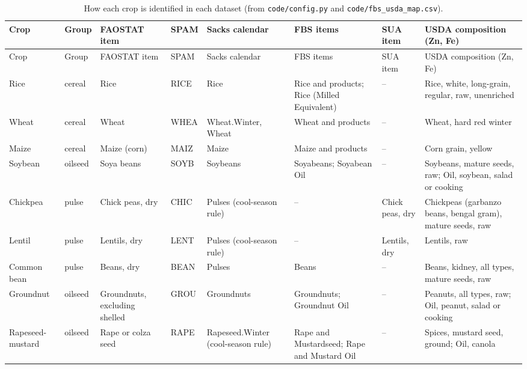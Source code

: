 {\scriptsize\begin{longtable}{L{0.105}L{0.072}L{0.124}L{0.059}L{0.137}L{0.170}L{0.098}L{0.235}}
\caption[How each crop is identified in each dataset]{How each crop is identified in each dataset (from \texttt{code/config.py} and \texttt{code/fbs\_usda\_map.csv}).}\label{tab:cropmap}\\
\toprule
Crop & Group & FAOSTAT item & SPAM & Sacks calendar & FBS items & SUA item & USDA composition (Zn, Fe) \\
\midrule\endfirsthead
\toprule
Crop & Group & FAOSTAT item & SPAM & Sacks calendar & FBS items & SUA item & USDA composition (Zn, Fe) \\
\midrule\endhead
\bottomrule\endfoot
Rice & cereal & Rice & RICE & Rice & Rice and products; Rice (Milled Equivalent) & -- & Rice, white, long-grain, regular, raw, unenriched \\
Wheat & cereal & Wheat & WHEA & Wheat.Winter, Wheat & Wheat and products & -- & Wheat, hard red winter \\
Maize & cereal & Maize (corn) & MAIZ & Maize & Maize and products & -- & Corn grain, yellow \\
Soybean & oilseed & Soya beans & SOYB & Soybeans & Soyabeans; Soyabean Oil & -- & Soybeans, mature seeds, raw; Oil, soybean, salad or cooking \\
Chickpea & pulse & Chick peas, dry & CHIC & Pulses (cool-season rule) & -- & Chick peas, dry & Chickpeas (garbanzo beans, bengal gram), mature seeds, raw \\
Lentil & pulse & Lentils, dry & LENT & Pulses (cool-season rule) & -- & Lentils, dry & Lentils, raw \\
Common bean & pulse & Beans, dry & BEAN & Pulses & Beans & -- & Beans, kidney, all types, mature seeds, raw \\
Groundnut & oilseed & Groundnuts, excluding shelled & GROU & Groundnuts & Groundnuts; Groundnut Oil & -- & Peanuts, all types, raw; Oil, peanut, salad or cooking \\
Rapeseed-mustard & oilseed & Rape or colza seed & RAPE & Rapeseed.Winter (cool-season rule) & Rape and Mustardseed; Rape and Mustard Oil & -- & Spices, mustard seed, ground; Oil, canola \\
\end{longtable}}
